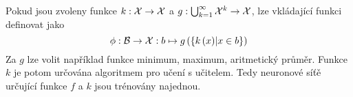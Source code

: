 Pokud jsou zvoleny funkce \( k : \mathcal X \to \mathcal X \) a \( g : \bigcup_{k = 1}^{\infty} \mathcal X^k \to \mathcal X \), lze vkládající funkci definovat jako
\begin{equation}
	\phi : \mathcal B \to \mathcal X : b \mapsto g \left( \left\{ k \left( x \right) \middle| x \in b \right\} \right)
\end{equation}
Za \( g \) lze volit například funkce minimum, maximum, aritmetický průměr. Funkce \( k \) je potom určována algoritmem pro učení s učitelem. Tedy neuronové síťě určující funkce \( f \) a \( k \) jsou trénovány najednou.
